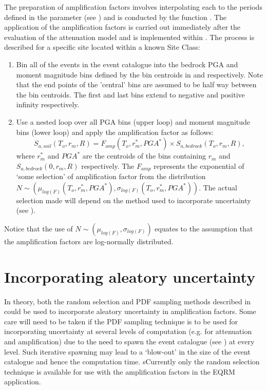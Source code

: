 The preparation of amplification factors involves interpolating
each to the periods defined in the 
parameter  (see )
and is conducted by the function . The
application of the amplification factors is carried out
immediately after the evaluation of the attenuation model and is
implemented within . The process
is described for a specific site located within a known Site
Class:
\begin{enumerate}
\item Bin all of the events in the event catalogue into the
bedrock PGA and moment magnitude bins defined by the bin centroids
in  and 
respectively. Note that the end points of the 'central' bins are
assumed to be half way between the bin centroids. The first and
last bins extend to negative and positive infinity respectively.
\item Use a nested loop over all PGA bins (upper loop) and moment
magnitude bins (lower loop) and apply the amplification factor as
follows:
\begin{equation}
S_{a,soil}(T_o,r_m,R)= F_{amp}(T_o,r_m^*,PGA^*) \times
S_{a,bedrock}(T_o,r_m,R),
\end{equation}
where $r_m^*$ and $PGA^*$ are the centroids of the bins containing
$r_m$ and \newline $S_{a,bedrock}(0,r_m,R)$ respectively. The
$F_{amp}$ represents the exponential of `some selection' of
amplification factor from the distribution \newline \mbox{$N \sim
(\mu_{log(F)}(T_o,r_m^*,PGA^*),\sigma_{log(F)}(T_o,r_m^*,PGA^*))$}.
The actual selection  made will depend on the method used to
incorporate uncertainty (see ).
\end{enumerate}
Notice that the use of $N \sim (\mu_{log(F)},\sigma_{log(F)})$
equates to the assumption that the amplification factors are
log-normally distributed.

\section{Incorporating aleatory uncertainty}
\label{sec:regolith-incorp-unc}


In theory, both the random selection and PDF sampling methods
described in  could be used to incorporate
aleatory uncertainty in amplification factors. Some care will need
to be taken if the PDF sampling technique is to be used for
incorporating uncertainty at several levels  of computation (e.g.
for attenuation and amplification) due to the need to spawn the
event catalogue (see ) at every level. Such
iterative spawning may lead to a `blow-out' in the size of the
event catalogue and hence the computation time. sCurrently only
the random selection technique is available for use with the
amplification factors in the EQRM application.


